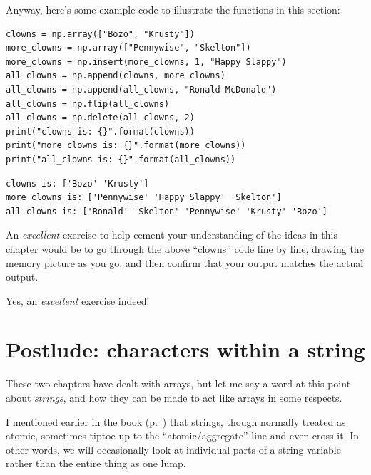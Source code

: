 Anyway, here's some example code to illustrate the functions in this section:

\begin{Verbatim}[fontsize=\small,samepage=true,frame=single,framesep=3mm]
clowns = np.array(["Bozo", "Krusty"])
more_clowns = np.array(["Pennywise", "Skelton"])
more_clowns = np.insert(more_clowns, 1, "Happy Slappy")
all_clowns = np.append(clowns, more_clowns)
all_clowns = np.append(all_clowns, "Ronald McDonald")
all_clowns = np.flip(all_clowns)
all_clowns = np.delete(all_clowns, 2)
print("clowns is: {}".format(clowns))
print("more_clowns is: {}".format(more_clowns))
print("all_clowns is: {}".format(all_clowns))
\end{Verbatim}

\begin{Verbatim}[fontsize=\footnotesize,samepage=true,frame=leftline,framesep=5mm,framerule=1mm]
clowns is: ['Bozo' 'Krusty']
more_clowns is: ['Pennywise' 'Happy Slappy' 'Skelton']
all_clowns is: ['Ronald' 'Skelton' 'Pennywise' 'Krusty' 'Bozo']
\end{Verbatim}


An \textit{excellent} exercise to help cement your understanding of the ideas
in this chapter would be to go through the above ``clowns'' code line by line,
drawing the memory picture as you go, and then confirm that your output matches
the actual output.

\smallskip

Yes, an \textit{excellent} exercise indeed!

\bigskip

\section[Characters within a string]{Postlude: characters within a string}


These two chapters have dealt with arrays, but let me say a word at this point
about \textit{strings}, and how they can be made to act like arrays in some
respects.

I mentioned earlier in the book (p.~\pageref{tiptoe}) that strings, though
normally treated as atomic, sometimes tiptoe up to the ``atomic/aggregate''
line and even cross it. In other words, we will occasionally look at individual
parts of a string variable rather than the entire thing as one lump.

